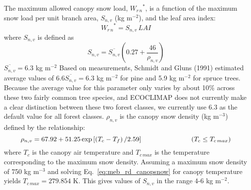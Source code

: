 The maximum allowed canopy snow load, ${W_{r\,n}}^\ast$, is a function
of the maximum snow load per unit branch area, $S_{n,v}$ (kg
m$^{-2}$), and the leaf area index:
%
\begin{equation}
  \label{eq:meb_rd_snowloadmax}
  {W_{r\,n}}^\ast = S_{n,v}\, LAI
\end{equation}
%
where $S_{n,v}$ is defined as
%
\begin{equation}
  \label{eq:meb_rd_snowsfactor}
  S_{n,v} = \overline{S_{n,v}} \left( 0.27 + \frac{46}{\rho_{n,v}} \right)
\end{equation}
%
$\overline{S_{n,v}}=6.3$ kg m$^{-2}$ 
Based on measurements, Schmidt and Gluns (1991)\nocite{Schmidt91}
estimated average values of 6.6$\overline{S_{n,v}}=6.3$ kg m$^{-2}$ for pine
and 5.9 kg m$^{-2}$ for spruce trees. Because the average value for this parameter only varies by about
10\% across these two fairly common tree species, and ECOCLIMAP does not currently make a clear
distinction between these two forest classes, we currently use 6.3 as the default value for all forest
classes.
%
$\rho_{n,v}$ is the canopy snow density 
(kg m$^{-3}$) defined by the relationship:
%
\begin{equation}
  \label{eq:meb_rd_canopsnow}
  \rho_{n,v} = 67.92 + 51.25 \exp\left[\left(T_c-T_f\right)/ 2.59\right]
\hskip1.in 
\left( T_c \leq T_{c\,max} \right)
\end{equation}
%
where $T_c$ is the canopy air temperature and $T_{c\,max}$ 
is the temperature corresponding to the maximum snow density. Assuming a maximum
snow density of 750 kg m$^{-3}$ and solving Eq.~\ref{eq:meb_rd_canopsnow} 
for canopy temperature yields $T_{c\,max}=279.854$ K.
This gives values of $S_{n,v}$ in the range 4-6 kg m$^{-2}$.


